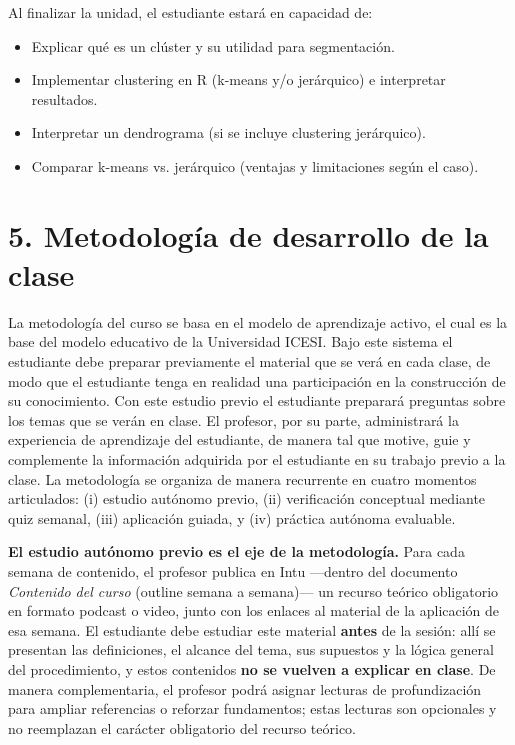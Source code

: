 \documentclass[11pt,a4paper]{article}
\begin{document}
Al finalizar la unidad, el estudiante estará en capacidad de:

\begin{itemize}
    \item Explicar qué es un clúster y su utilidad para segmentación.
    \item Implementar clustering en R (k-means y/o jerárquico) e interpretar resultados.
    \item Interpretar un dendrograma (si se incluye clustering jerárquico).
    \item Comparar k-means vs. jerárquico (ventajas y limitaciones según el caso).
\end{itemize}


\section*{5. Metodología de desarrollo de la clase}

La metodología del curso se basa en el modelo de aprendizaje activo, el cual es la base del modelo educativo de la Universidad ICESI. Bajo este sistema el estudiante debe preparar previamente el material que se verá en cada clase, de modo que el estudiante tenga en realidad una participación en la construcción de su conocimiento. Con este estudio previo el estudiante preparará preguntas sobre los temas que se verán en clase. El profesor, por su parte, administrará la experiencia de aprendizaje del estudiante, de manera tal que motive, guie y complemente la información adquirida por el estudiante en su trabajo previo a la clase. La metodología se organiza de manera recurrente en cuatro momentos articulados: (i) estudio autónomo previo, (ii) verificación conceptual mediante quiz semanal, (iii) aplicación guiada, y (iv) práctica autónoma evaluable.

\vspace{0.3cm}

\textbf{El estudio autónomo previo es el eje de la metodología.} Para cada semana de contenido, el profesor publica en Intu ---dentro del documento \textit{Contenido del curso} (outline semana a semana)--- un recurso teórico obligatorio en formato podcast o video, junto con los enlaces al material de la aplicación de esa semana. El estudiante debe estudiar este material \textbf{antes} de la sesión: allí se presentan las definiciones, el alcance del tema, sus supuestos y la lógica general del procedimiento, y estos contenidos \textbf{no se vuelven a explicar en clase}. De manera complementaria, el profesor podrá asignar lecturas de profundización para ampliar referencias o reforzar fundamentos; estas lecturas son opcionales y no reemplazan el carácter obligatorio del recurso teórico.
\end{document}
